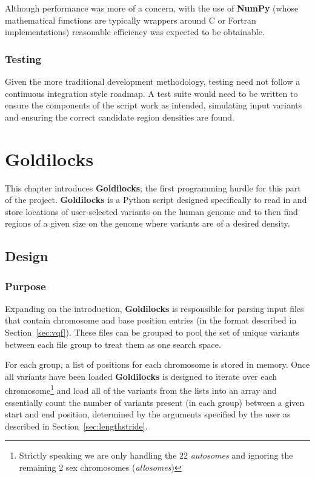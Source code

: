 Although performance was more of a concern, with the use of \textbf{NumPy}
(whose mathematical functions are typically wrappers around C or Fortran
implementations) reasonable efficiency was expected to be obtainable.


\subsection{Testing}

Given the more traditional development methodology, testing need not follow a
continuous integration style roadmap. A test suite would need to be written to
ensure the components of the script work as intended, simulating input variants
and ensuring the correct candidate region densities are found.


\chapter{Goldilocks}

This chapter introduces \textbf{Goldilocks}; the first programming hurdle for
this part of the project. \textbf{Goldilocks} is a Python script designed
specifically to read in and store locations of user-selected variants on the
human genome and to then find regions of a given size on the genome where
variants are of a desired density.


\section{Design}
\subsection{Purpose}
\label{sec:goldilocks-purpose}

Expanding on the introduction, \textbf{Goldilocks} is responsible for parsing
input files that contain chromosome and base position entries (in the format
described in Section~\ref{sec:vqf}). These files can be grouped to pool the set
of unique variants between each file group to treat them as one search space.

For each group, a list of positions for each chromosome is stored in
memory. Once all variants have been loaded \textbf{Goldilocks} is designed to
iterate over each chromosome\footnote{Strictly speaking we are only handling the
22 \textit{autosomes} and ignoring the remaining 2 sex chromosomes
(\textit{allosomes})} and load all of the variants from the lists into an array
and essentially count the number of variants present (in each group) between a
given start and end position, determined by the arguments specified by the user
as described in Section~\ref{sec:lengthstride}.

